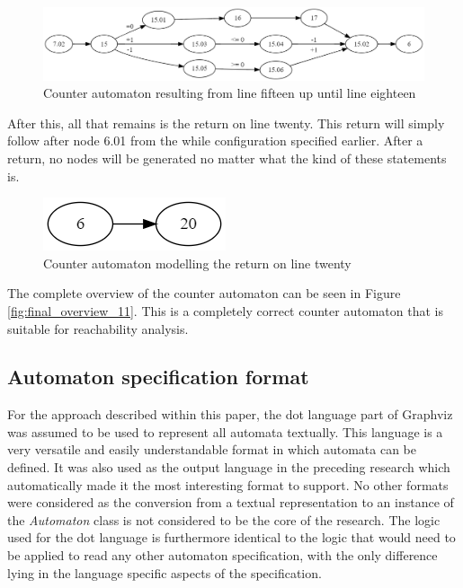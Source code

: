 \documentclass[12pt]{article}
\begin{document}
\begin{figure}[h]
	\centering
	\includegraphics[width=\linewidth]{final_overview_9}
	\caption{Counter automaton resulting from line fifteen up until line eighteen}
	\label{fig:final_overview_9}
\end{figure}

After this, all that remains is the return on line twenty. This return will simply follow after node 6.01 from the while configuration specified earlier. After a return, no nodes will be generated no matter what the kind of these statements is.

\begin{figure}[h]
	\centering
	\includegraphics[width=0.35\linewidth]{final_overview_10}
	\caption{Counter automaton modelling the return on line twenty}
	\label{fig:final_overview_10}
\end{figure}

The complete overview of the counter automaton can be seen in Figure \ref{fig:final_overview_11}. This is a completely correct counter automaton that is suitable for reachability analysis.

\subsection{Automaton specification format}
\label{sec:automaton input}
For the approach described within this paper, the dot language part of Graphviz\cite{10.1007/3-540-45848-4_57} was assumed to be used to represent all automata textually. This language is a very versatile and easily understandable format in which automata can be defined. It was also used as the output language in the preceding research which automatically made it the most interesting format to support. No other formats were considered as the conversion from a textual representation to an instance of the \textit{Automaton} class is not considered to be the core of the research. The logic used for the dot language is furthermore identical to the logic that would need to be applied to read any other automaton specification, with the only difference lying in the language specific aspects of the specification.
\end{document}
